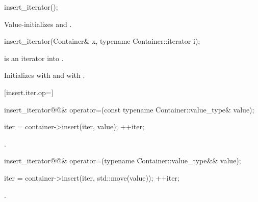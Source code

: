 %
\begin{addedblock}
\begin{itemdecl}
insert_iterator();
\end{itemdecl}

\begin{itemdescr}
\pnum
\effects
Value-initializes
 and .
\end{itemdescr}
\end{addedblock}

%

\begin{itemdecl}
insert_iterator(Container& x, typename Container::iterator i);
\end{itemdecl}

\begin{itemdescr}
{\color{newclr}
\pnum
\requires
{} is an iterator into .
}%

\pnum
\effects
Initializes
with  and
with .
\end{itemdescr}

[insert.iter.op=]{}

%
\begin{itemdecl}
insert_iterator@@&
  operator=(const typename Container::value_type& value);
\end{itemdecl}

\begin{itemdescr}
\pnum
\effects {}
\begin{codeblock}
iter = container->insert(iter, value);
++iter;
\end{codeblock}

\pnum
\returns
{}.
\end{itemdescr}

%
\begin{itemdecl}
insert_iterator@@&
  operator=(typename Container::value_type&& value);
\end{itemdecl}

\begin{itemdescr}
\pnum
\effects {}
\begin{codeblock}
iter = container->insert(iter, std::move(value));
++iter;
\end{codeblock}

\pnum
\returns
{}.
\end{itemdescr}

